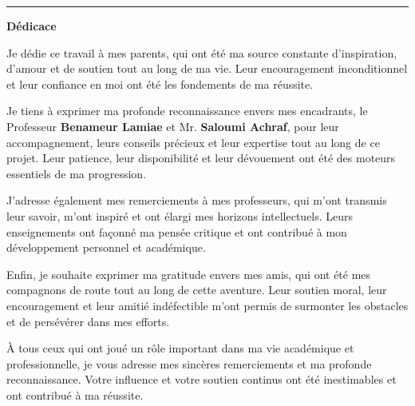 \documentclass[12pt, a4paper, openany]{report}
\begin{document}
\newpage
\thispagestyle{frontmatter} %

\vspace*{0.5cm} %

\noindent
\textcolor{royalBlue}{\rule{0.65\textwidth}{1pt}}
\hfill
{\fontsize{24}{28}\selectfont\color{royalBlue}\bfseries Dédicace}

\vspace{1.5cm}

\begin{large}
\itshape
\setlength{\parskip}{0.3cm} %
\renewcommand{\baselinestretch}{1.3}\selectfont %

Je dédie ce travail à mes parents, qui ont été ma source constante d'inspiration, d'amour et de soutien tout au long de ma vie. Leur encouragement inconditionnel et leur confiance en moi ont été les fondements de ma réussite.

Je tiens à exprimer ma profonde reconnaissance envers mes encadrants, le Professeur \textbf{Benameur Lamiae} et Mr. \textbf{Saloumi Achraf}, pour leur accompagnement, leurs conseils précieux et leur expertise tout au long de ce projet. Leur patience, leur disponibilité et leur dévouement ont été des moteurs essentiels de ma progression.

J'adresse également mes remerciements à mes professeurs, qui m'ont transmis leur savoir, m'ont inspiré et ont élargi mes horizons intellectuels. Leurs enseignements ont façonné ma pensée critique et ont contribué à mon développement personnel et académique.

Enfin, je souhaite exprimer ma gratitude envers mes amis, qui ont été mes compagnons de route tout au long de cette aventure. Leur soutien moral, leur encouragement et leur amitié indéfectible m'ont permis de surmonter les obstacles et de persévérer dans mes efforts.

À tous ceux qui ont joué un rôle important dans ma vie académique et professionnelle, je vous adresse mes sincères remerciements et ma profonde reconnaissance. Votre influence et votre soutien continus ont été inestimables et ont contribué à ma réussite.

\end{large}
\end{document}
